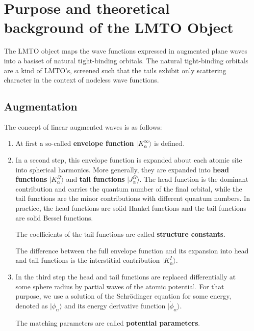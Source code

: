 \documentclass[11pt,a4paper]{report}
\begin{document}
\chapter{Purpose and theoretical background of the LMTO Object}
The LMTO object maps the wave functions expressed in augmented plane
waves into a basiset of natural tight-binding orbitals. The natural
tight-binding orbitals are a kind of LMTO's, screened such that the
tails exhibit only scattering character in the context of nodeless
wave functions\cite{bloechl12_arxiv1210_5937}.

\section{Augmentation}
The concept of linear augmented waves is as follows: 
\begin{enumerate}
\item At first a so-called \textbf{envelope function} $|K^\infty_\alpha\rangle$ is defined.
%
\item In a second step, this envelope function is expanded about each
  atomic site into spherical harmonics.  More generally, they are
  expanded into \textbf{head functions}
  $|K^\Omega_\alpha\rangle$ and \textbf{tail functions} $|J^\Omega_\alpha\rangle$. The head function is the
  dominant contribution and carries the quantum number of the final
  orbital, while the tail functions are the minor contributions with
  different quantum numbers. In practice, the head functions are solid
  Hankel functions and the tail functions are solid Bessel functions.

   The coefficients of the tail functions are called \textbf{structure
     constants}.

  The difference between the full envelope function and its expansion
  into head and tail functions is the interstitial contribution
  $|K^I_\alpha\rangle$.
%
\item In the third step the head and tail functions are replaced
  differentially at some sphere radius by partial waves of the atomic
  potential. For that purpose, we use a solution of the Schr\"odinger
  equation for some energy, denoted as $|\phi_{\alpha}\rangle$ and its
  energy derivative function $|\dot{\phi}_\alpha\rangle$.

  The matching parameters are called \textbf{potential
    parameters}.
\end{enumerate}
\end{document}
